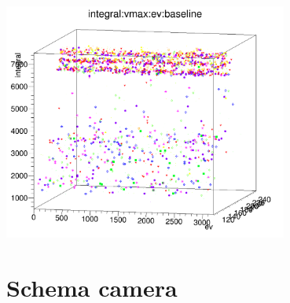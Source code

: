 \documentclass[11pt,a4paper]{article} %
\begin{document}
%

{

\maketitle %

\begin{center}
	\includegraphics[width=0.7\textwidth]{stelle_di_natale_quadrimensionale.png}
\end{center}

\newpage
\begin{abstract}
	\noindent
	
\end{abstract}

\newpage


\tableofcontents %
{} %


\section{Schema camera}
	

}
\end{document}

